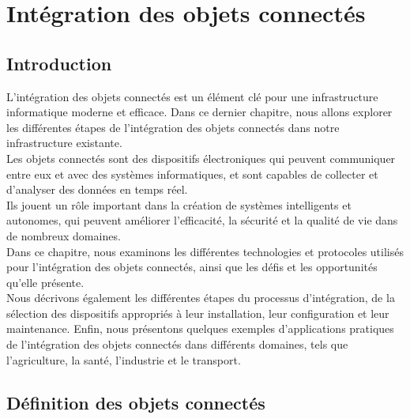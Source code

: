 \chapter{Intégration des objets connectés}

\section{Introduction}

L'intégration des objets connectés est un élément clé pour une infrastructure informatique moderne et efficace. Dans ce dernier chapitre, nous allons explorer les différentes étapes de l'intégration des objets connectés dans notre infrastructure existante. \\

Les objets connectés sont des dispositifs électroniques qui peuvent communiquer entre eux et avec des systèmes informatiques, et sont capables de collecter et d'analyser des données en temps réel. \\

Ils jouent un rôle important dans la création de systèmes intelligents et autonomes, qui peuvent améliorer l'efficacité, la sécurité et la qualité de vie dans de nombreux domaines. \\

Dans ce chapitre, nous examinons les différentes technologies et protocoles utilisés pour l'intégration des objets connectés, ainsi que les défis et les opportunités qu'elle présente. \\

Nous décrivons également les différentes étapes du processus d'intégration, de la sélection des dispositifs appropriés à leur installation, leur configuration et leur maintenance. Enfin, nous présentons quelques exemples d'applications pratiques de l'intégration des objets connectés dans différents domaines, tels que l'agriculture, la santé, l'industrie et le transport. \\







\section{Définition des objets connectés}

